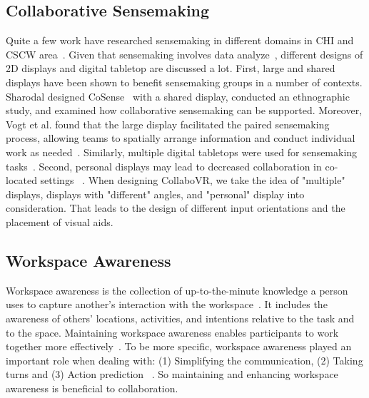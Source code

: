 \documentclass{sigchi}
\begin{document}
\subsection{Collaborative Sensemaking}
Quite a few work have researched sensemaking in different domains in CHI and CSCW area~\cite{albolino2007sensemaking, billman2007medical, landgren2007study,paul2009understanding}. Given that sensemaking involves data analyze~\cite{yi2008understanding}, different designs of 2D displays and digital tabletop are discussed a lot. First, large and shared displays have been shown to benefit sensemaking groups in a number of contexts. Sharodal designed CoSense~\cite{dervin1992mind} with a shared display, conducted an ethnographic study, and examined how collaborative sensemaking can be supported. Moreover, Vogt et al. found that the large display facilitated the paired sensemaking process, allowing teams to spatially arrange information and conduct individual work as needed~\cite{vogt2011co}. Similarly, multiple digital tabletops were used for sensemaking tasks~\cite{isenberg2010exploratory,morris2010wesearch}. Second, personal displays may lead to decreased collaboration in co-located settings ~\cite{chung2013investigating, wallace2009investigating}.
When designing CollaboVR, we take the idea of "multiple" displays, displays with "different" angles, and "personal" display into consideration. That leads to the design of different input orientations and the placement of visual aids.

\subsection{Workspace Awareness}
Workspace awareness is the collection of up-to-the-minute knowledge a person uses to capture another's interaction with the workspace~\cite{gutwin1996workspace}. It includes the awareness of others' locations, activities, and intentions relative to the task and to the space. Maintaining workspace awareness enables participants to work together more effectively~\cite{gutwin1998design, gutwin2002descriptive}. To be more specific, workspace awareness played an important role when dealing with: (1) Simplifying the communication, (2) Taking turns and (3) Action prediction ~\cite{gutwin2002descriptive}. So maintaining and enhancing workspace awareness is beneficial to collaboration. 
\end{document}
